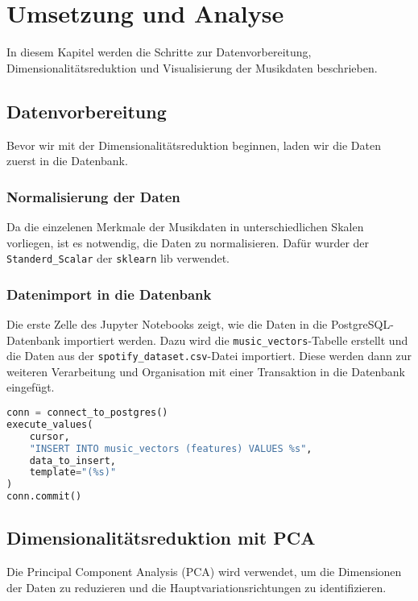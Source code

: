\chapter{Umsetzung und Analyse}

In diesem Kapitel werden die Schritte zur Datenvorbereitung, Dimensionalitätsreduktion und Visualisierung der Musikdaten beschrieben.

\section{Datenvorbereitung}

Bevor wir mit der Dimensionalitätsreduktion beginnen, laden wir die Daten zuerst in die Datenbank.

\subsection*{Normalisierung der Daten}
Da die einzelenen Merkmale der Musikdaten in unterschiedlichen Skalen vorliegen, ist es notwendig, die Daten zu normalisieren. Dafür wurder der \texttt{Standerd\_Scalar} der \texttt{sklearn} lib verwendet.

\subsection*{Datenimport in die Datenbank}
Die erste Zelle des Jupyter Notebooks zeigt, wie die Daten in die PostgreSQL-Datenbank importiert werden. Dazu wird die \texttt{music\_vectors}-Tabelle erstellt und die Daten aus der \texttt{spotify\_dataset.csv}-Datei importiert. Diese werden dann zur weiteren Verarbeitung und Organisation mit einer Transaktion in die Datenbank eingefügt.

\begin{lstlisting}[language=python, caption={Insert der Musikdaten in die Datenbank}]
conn = connect_to_postgres()
execute_values(
    cursor,
    "INSERT INTO music_vectors (features) VALUES %s",
    data_to_insert,
    template="(%s)"
)
conn.commit()
\end{lstlisting}




\section{Dimensionalitätsreduktion mit PCA}

Die Principal Component Analysis (PCA) wird verwendet, um die Dimensionen der Daten zu reduzieren und die Hauptvariationsrichtungen zu identifizieren.

